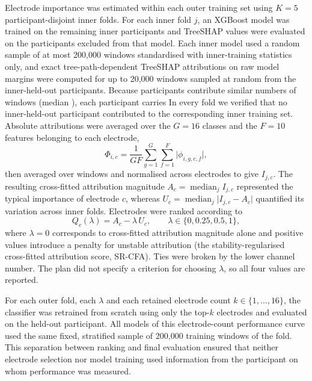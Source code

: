 Electrode importance was estimated within each outer training set using $K = 5$ participant-disjoint inner folds. For each inner fold $j$, an XGBoost model was trained on the remaining inner participants and TreeSHAP values were evaluated on the participants excluded from that model. Each inner model used a random sample of at most 200,000 windows standardised with inner-training statistics only, and exact tree-path-dependent TreeSHAP attributions on raw model margins \citep{lundberg2020local} were computed for up to 20,000 windows sampled at random from the inner-held-out participants. Because participants contribute similar numbers of windows (median \TestWindowsPerParticipant), each participant carries  In every fold we verified that no inner-held-out participant contributed to the corresponding inner training set. Absolute attributions were averaged over the $G = 16$ classes and the $F = 10$ features belonging to each electrode,
\begin{equation}
\Phi_{i,c} = \frac{1}{G F}\sum_{g=1}^{G}\sum_{f=1}^{F} \lvert \phi_{i,g,c,f} \rvert,
\end{equation}
then averaged over windows and normalised across electrodes to give $I_{j,c}$. The resulting cross-fitted attribution magnitude $A_c = \operatorname{median}_j I_{j,c}$ represented the typical importance of electrode $c$, whereas $U_c = \operatorname{median}_j \lvert I_{j,c} - A_c \rvert$ quantified its variation across inner folds. Electrodes were ranked according to
\begin{equation}
Q_c(\lambda) = A_c - \lambda\, U_c, \qquad \lambda \in \{0, 0.25, 0.5, 1\},
\label{eq:srcfa}
\end{equation}
where $\lambda = 0$ corresponds to cross-fitted attribution magnitude alone and positive values introduce a penalty for unstable attribution (the stability-regularised cross-fitted attribution score, SR-CFA). Ties were broken by the lower channel number. The plan did not specify a criterion for choosing $\lambda$, so all four values are reported.

For each outer fold, each $\lambda$ and each retained electrode count $k \in \{1, \ldots, 16\}$, the classifier was retrained from scratch using only the top-$k$ electrodes and evaluated on the held-out participant. All models of this electrode-count performance curve used the same fixed, stratified sample of 200,000 training windows of the fold. This separation between ranking and final evaluation ensured that neither electrode selection nor model training used information from the participant on whom performance was measured. 

